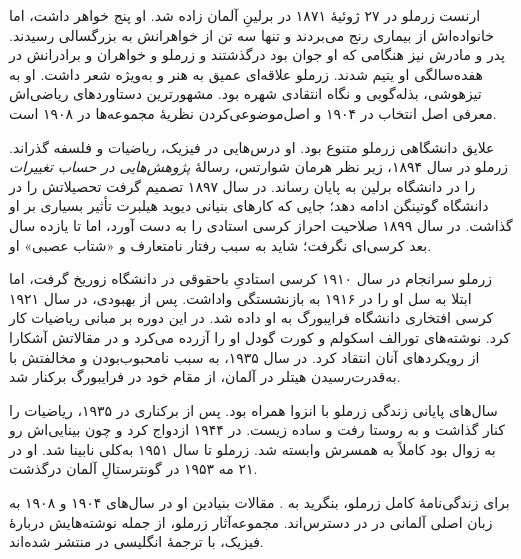 \documentclass[../../../include/open-logic-section]{subfiles}
\begin{document}



ارنست زرملو در ۲۷ ژوئیهٔ ۱۸۷۱ در برلینِ آلمان زاده شد. او پنج خواهر
داشت، اما خانواده‌اش از بیماری رنج می‌بردند و تنها سه تن از خواهرانش به
بزرگسالی رسیدند. پدر و مادرش نیز هنگامی که او جوان بود درگذشتند و زرملو و
خواهران و برادرانش در هفده‌سالگی او یتیم شدند. زرملو علاقه‌ای عمیق به هنر
و به‌ویژه شعر داشت. او به تیزهوشی، بذله‌گویی و نگاه انتقادی شهره بود.
مشهورترین دستاوردهای ریاضی‌اش معرفی اصل انتخاب در ۱۹۰۴ و اصل‌موضوعی‌کردن
نظریهٔ مجموعه‌ها در ۱۹۰۸ است.

علایق دانشگاهی زرملو متنوع بود. او درس‌هایی در فیزیک، ریاضیات و فلسفه
گذراند. زرملو در سال ۱۸۹۴، زیر نظر هرمان شوارتس، رسالهٔ
\emph{پژوهش‌هایی در حساب تغییرات} را در دانشگاه برلین به پایان رساند. در
سال ۱۸۹۷ تصمیم گرفت تحصیلاتش را در دانشگاه گوتینگن ادامه دهد؛ جایی که
کارهای بنیانی دیوید هیلبرت تأثیر بسیاری بر او گذاشت. در سال ۱۸۹۹ صلاحیت
احراز کرسی استادی را به دست آورد، اما تا یازده سال بعد کرسی‌ای نگرفت؛
شاید به سبب رفتار نامتعارف و «شتاب عصبی» او.

زرملو سرانجام در سال ۱۹۱۰ کرسی استادیِ باحقوقی در دانشگاه زوریخ گرفت،
اما ابتلا به سل او را در ۱۹۱۶ به بازنشستگی واداشت. پس از بهبودی، در سال
۱۹۲۱ کرسی افتخاری دانشگاه فرایبورگ به او داده شد. در این دوره بر مبانی
ریاضیات کار کرد. نوشته‌های تورالف اسکولم و کورت گودل او را آزرده می‌کرد و
در مقالاتش آشکارا از رویکردهای آنان انتقاد کرد. در سال ۱۹۳۵، به سبب
نامحبوب‌بودن و مخالفتش با به‌قدرت‌رسیدن هیتلر در آلمان، از مقام خود در
فرایبورگ برکنار شد.

سال‌های پایانی زندگی زرملو با انزوا همراه بود. پس از برکناری در ۱۹۳۵،
ریاضیات را کنار گذاشت و به روستا رفت و ساده زیست. در ۱۹۴۴ ازدواج کرد و
چون بینایی‌اش رو به زوال بود کاملاً به همسرش وابسته شد. زرملو تا سال ۱۹۵۱
به‌کلی نابینا شد. او در ۲۱ مه ۱۹۵۳ در گونترستالِ آلمان درگذشت.

\begin{reading}
برای زندگی‌نامهٔ کامل زرملو، بنگرید به \citet{Ebbinghaus2015}. مقالات
بنیادین او در سال‌های ۱۹۰۴ و ۱۹۰۸ به زبان اصلی آلمانی در
\citep{Zermelo1904,Zermelo1908} در دسترس‌اند. مجموعه‌آثار زرملو، از جمله
نوشته‌هایش دربارهٔ فیزیک، با ترجمهٔ انگلیسی در
\citep{Ebbinghaus2010,Ebbinghaus2013} منتشر شده‌اند.
\end{reading}
\end{document}
